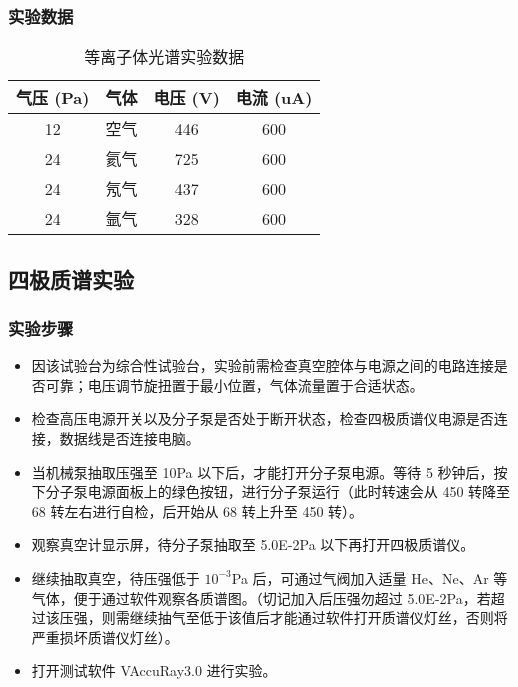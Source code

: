 \documentclass[dvipsnames, svgnames,a4paper,11pt]{article}
\begin{document}
\subsubsection{实验数据}
\begin{table}[htbp]
    \centering    
	\caption{等离子体光谱实验数据}
    \begin{tabular}{|c|c|c|c|}
        \hline
        \textbf{气压 (Pa)} & \textbf{气体} & \textbf{电压 (V)} & \textbf{电流 (uA)} \\ \hline
        12  & 空气  & 446  & 600  \\ \hline
        24  & 氦气  & 725  & 600  \\ \hline
        24  & 氖气  & 437  & 600  \\ \hline
        24  & 氩气  & 328  & 600 \\ \hline
    \end{tabular}

\end{table}
\subsection{四极质谱实验}
\subsubsection{实验步骤}
\begin{itemize}
    \item 因该试验台为综合性试验台，实验前需检查真空腔体与电源之间的电路连接是否可靠；电压调节旋扭置于最小位置，气体流量置于合适状态。
    
    \item 检查高压电源开关以及分子泵是否处于断开状态，检查四极质谱仪电源是否连接，数据线是否连接电脑。
    
    \item 当机械泵抽取压强至 10Pa 以下后，才能打开分子泵电源。等待 5 秒钟后，按下分子泵电源面板上的绿色按钮，进行分子泵运行（此时转速会从 450 转降至 68 转左右进行自检，后开始从 68 转上升至 450 转）。
    
    \item 观察真空计显示屏，待分子泵抽取至 5.0E-2Pa 以下再打开四极质谱仪。
    
    \item 继续抽取真空，待压强低于 $10^{-3}$Pa 后，可通过气阀加入适量 He、Ne、Ar 等气体，便于通过软件观察各质谱图。（切记加入后压强勿超过 5.0E-2Pa，若超过该压强，则需继续抽气至低于该值后才能通过软件打开质谱仪灯丝，否则将严重损坏质谱仪灯丝）。
    
    \item 打开测试软件 VAccuRay3.0 进行实验。
\end{itemize}
\end{document}
